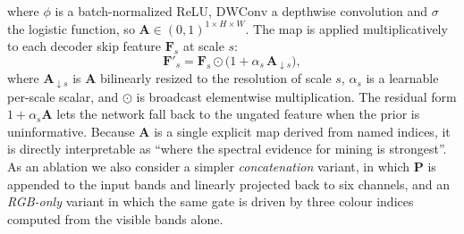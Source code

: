 \documentclass[review]{elsarticle}
\begin{document}
where $\phi$ is a batch-normalized ReLU, $\mathrm{DWConv}$ a depthwise convolution and
$\sigma$ the logistic function, so $\mathbf{A}\in(0,1)^{1\times H\times W}$. The map is
applied multiplicatively to each decoder skip feature $\mathbf{F}_s$ at scale $s$:
\begin{equation}
\mathbf{F}'_s = \mathbf{F}_s \odot \big(1 + \alpha_s\, \mathbf{A}_{\downarrow s}\big),
\label{eq:apply}
\end{equation}
where $\mathbf{A}_{\downarrow s}$ is $\mathbf{A}$ bilinearly resized to the resolution of
scale $s$, $\alpha_s$ is a learnable per-scale scalar, and $\odot$ is broadcast elementwise
multiplication. The residual form $1+\alpha_s\mathbf{A}$ lets the network fall back to the
ungated feature when the prior is uninformative. Because $\mathbf{A}$ is a single explicit
map derived from named indices, it is directly interpretable as ``where the spectral
evidence for mining is strongest''. As an ablation we also consider a simpler
\emph{concatenation} variant, in which $\mathbf{P}$ is appended to the input bands and
linearly projected back to six channels, and an \emph{RGB-only} variant in which the same
gate is driven by three colour indices computed from the visible bands alone.
\end{document}
